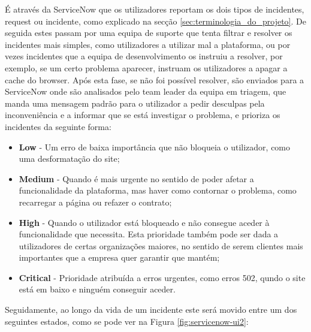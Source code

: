         É através da ServiceNow que os utilizadores reportam os dois tipos de incidentes, request ou incidente, como explicado na secção \ref{sec:terminologia_do_projeto}. De seguida estes passam por uma equipa de suporte que tenta filtrar e resolver os incidentes mais simples, como utilizadores a utilizar mal a plataforma, ou por vezes incidentes que a equipa de desenvolvimento os instruiu a resolver, por exemplo, se um certo problema aparecer, instruam os utilizadores a apagar a cache do browser. Após esta fase, se não foi possível resolver, são enviados para a ServiceNow onde são analisados pelo team leader da equipa em triagem, que manda uma mensagem padrão para o utilizador a pedir desculpas pela inconveniência e a informar que se está investigar o problema, e prioriza os incidentes da seguinte forma:
        \begin{itemize}
            \item \textbf{Low} - Um erro de baixa importância que não bloqueia o utilizador, como uma desformatação do site;
            \item \textbf{Medium} - Quando é mais urgente no sentido de poder afetar a funcionalidade da plataforma, mas haver como contornar o problema, como recarregar a página ou refazer o contrato;
            \item \textbf{High} - Quando o utilizador está bloqueado e não consegue aceder à funcionalidade que necessita. Esta prioridade também pode ser dada a utilizadores de certas organizações maiores, no sentido de serem clientes mais importantes que a empresa quer garantir que mantém;
            \item \textbf{Critical} - Prioridade atribuída a erros urgentes, como erros 502, qundo o site está em baixo e ninguém conseguir aceder.
        \end{itemize}
        Seguidamente, ao longo da vida de um incidente este será movido entre um dos seguintes estados, como se pode ver na Figura \ref{fig:servicenow-ui2}:
